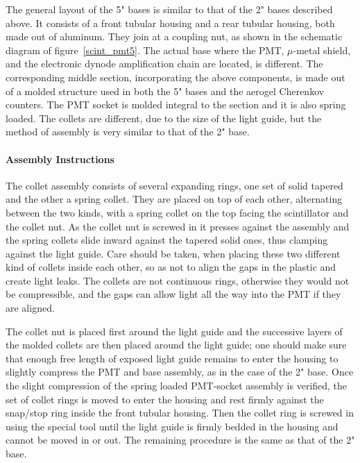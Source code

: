 


   The general layout of the 5" bases is similar to that of the 2" bases
described above. It consists of a front tubular housing and a rear tubular
housing, both made out of aluminum. They join at a coupling nut, as shown in
the schematic diagram of figure~\ref{scint_pmt5}. The actual base where the PMT,
$\mu$-metal
shield, and the electronic dynode amplification chain are located, is
different. The corresponding middle section, incorporating the above
components, is made out of a molded structure used in both the 5" bases and
the aerogel Cherenkov counters. The PMT socket is molded integral to the
section and it is also spring loaded. The collets are different, due to the
size of the light guide, but the method of assembly is very similar to that of
the 2" base. 


\paragraph{Assembly Instructions}

   The collet assembly consists of several expanding rings, one set of solid
tapered and the other a spring collet. They are placed on top of each other,
alternating between the two kinds, with a spring collet on the top facing the
scintillator and the collet nut. As the collet nut is screwed in it presses
against the assembly and the spring collets slide inward against the tapered
solid ones, thus clamping against the light guide. Care should be taken, when
placing these two different kind of collets inside each other, so as not to
align the gaps in the plastic and create light leaks. The collets are not
continuous rings, otherwise they would not be compressible, and the gaps can
allow light all the way into the PMT if they are aligned. 

The collet nut is placed first around the light guide and the successive layers 
of the molded collets are then placed around the light guide; one should make 
sure that enough free length of exposed light guide remains to enter the 
housing to slightly compress the PMT and base assembly, as in the case of the 
2" base. Once the slight compression of the spring loaded PMT-socket assembly 
is verified, the set of collet rings is moved to enter the housing and rest 
firmly against the snap/stop ring inside the front tubular housing. Then the 
collet ring is screwed in using the special tool until the light guide is 
firmly bedded in the housing and cannot be moved in or out. The remaining 
procedure is the same as that of the 2" base.

